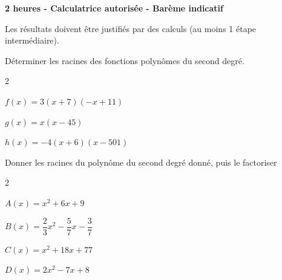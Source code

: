 \documentclass[12pt,a4paper]{article}  %
\begin{document}
\begin{center}

\end{center}


\begin{center}\textbf{2 heures - Calculatrice autorisée - Barème indicatif}\end{center}


\begin{center}
Les résultats doivent être justifiés par des calculs (au moins 1 étape intermédiaire).
\end{center}
\vspace{.05cm} 

\vspace*{-0.5cm}

Déterminer les racines des fonctions polynômes du second degré.
\begin{multicols}{2}
\begin{enumMet}
    \item $f(x)=3(x+7)(-x+11)$ 
    \item $g(x)=x(x-45)$ 
    \item $h(x)=-4(x+6)(x-501)$ 
\end{enumMet}
\end{multicols}

\vspace{-0.3cm}

Donner les racines du polynôme du second degré donné, puis le factoriser
\begin{multicols}{2}
\begin{enumMet}
    \item $A(x)=x^{2}+6 x+9$ 
    \item $B(x)=\dfrac{2}{3}x^{2}-\dfrac{5}{7} x-\dfrac{3}{7}$ 
    \item $C(x)=x^{2}+18 x+77$ 
    \item $D(x)=2 x^{2}-7 x+8$ 
\end{enumMet}
\end{multicols}
\end{document}
